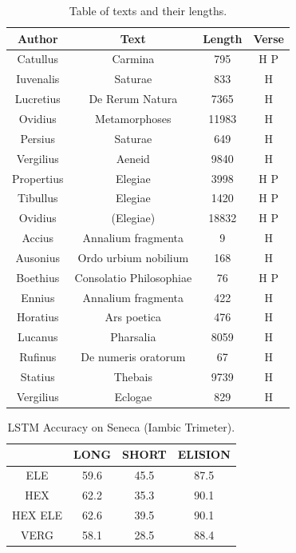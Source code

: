 \begin{table}[h]
\centering
    \begin{tabular}{||c c c c ||} 
     \hline
     Author & Text & Length & Verse \\ [0.5ex] 
     \hline\hline
        Catullus & Carmina &795 & H P\\
        Iuvenalis & Saturae & 833 & H\\
        Lucretius & De Rerum Natura & 7365 & H\\
        Ovidius & Metamorphoses & 11983 & H\\
        Persius & Saturae & 649 & H\\
        Vergilius & Aeneid & 9840 & H\\ %
        \hline
        Propertius & Elegiae & 3998 & H P\\
        Tibullus & Elegiae & 1420 & H P\\
        Ovidius & (Elegiae) & 18832 & H P\\
        \hline
        Accius & Annalium fragmenta & 9 & H\\
        Ausonius & Ordo urbium nobilium & 168 & H\\
        Boethius & Consolatio Philosophiae & 76 & H P\\
        Ennius & Annalium fragmenta & 422 & H\\
        Horatius & Ars poetica & 476 & H\\
        Lucanus & Pharsalia & 8059 & H\\
        Rufinus & De numeris oratorum & 67 & H\\
        Statius & Thebais & 9739 & H\\
        Vergilius & Eclogae & 829 & H\\
     \hline

    \end{tabular}
    \caption{Table of texts and their lengths.}
    \label{table:1}
\end{table}

\begin{table}[h]
\centering
    \begin{tabular}{||c c c c ||} 
     \hline
      & LONG & SHORT & ELISION \\ [0.5ex] 
     \hline\hline
        ELE & 59.6 & 45.5 & 87.5\\
        HEX & 62.2 & 35.3 & 90.1\\
        HEX ELE & 62.6 & 39.5 & 90.1\\
        VERG & 58.1 & 28.5 & 88.4\\ [1ex]
     \hline

    \end{tabular}
    \caption{LSTM Accuracy on Seneca (Iambic Trimeter).}
    \label{table:2}
\end{table}

